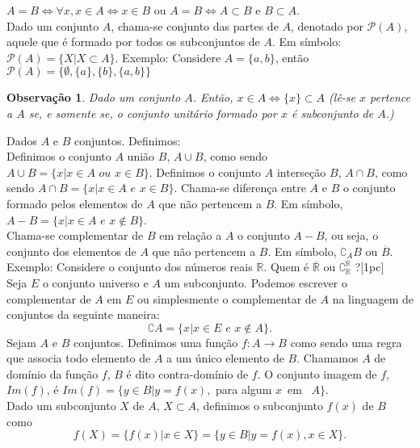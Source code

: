 \documentclass[10pt]{article}
\newtheorem{obs}{Observação}
\begin{document}
 $A=B\Leftrightarrow \forall x, x\in A\Leftrightarrow x\in B$ ou $A=B\Leftrightarrow A\subset B$ e $B\subset A$.\\
 Dado um conjunto $A$, chama-se conjunto das partes de $A$, denotado por $\mathcal{P}(A)$, aquele que é formado por todos os subconjuntos de $A$. Em símbolo: $\mathcal{P}(A)=\{X|X\subset A\}$. Exemplo: Considere $A=\{a,b\}$, então $\mathcal{P}(A)=\{\emptyset, \{a\}, \{b\}, \{a,b\}\}$\\
\begin{obs} Dado um conjunto $A$. Então, $x\in A\Leftrightarrow \{x\}\subset A$ (lê-se $x$ pertence a $A$ se, e somente se, o conjunto unitário formado por $x$ é subconjunto de $A$.)\end{obs}
\noindent Dados $A$ e $B$ conjuntos. Definimos:\\
Definimos o conjunto $A$ união $B$, $A\cup B$, como sendo $A\cup B=\{x| x\in A\, \, ou \, \, x\in B\}$. Definimos o conjunto $A$ interseção $B$, $A\cap B$, como sendo $A\cap B=\{x| x\in A\, \, e\, \, x\in B\}$.
Chama-se diferença entre $A$ e $B$ o conjunto formado pelos elementos de $A$ que não pertencem a $B$. Em símbolo, $A-B=\{x|x\in A\, \, e\, \, x\not\in B\}$.\\
 Chama-se complementar de $B$ em relação a $A$ o conjunto $A-B$, ou seja, o conjunto dos elementos de $A$ que não pertencem a $B$. Em símbolo, $\complement_{A} {B}$ ou $\overline{B}$. Exemplo: Considere o conjunto dos números reais $\mathbb{R}$. Quem é $\overline{\mathbb{R}}$ ou $\complement_{\mathbb{R}}^{\mathbb{R}}$ ?[1pc]\\
 Seja $E$ o conjunto universo  e $A$ um subconjunto. Podemos escrever o complementar de $A$ em $E$ ou simplesmente o complementar de $A$ na linguagem de conjuntos da seguinte maneira: $$\complement A=\{x| x\in E\, \, e\, \, x\not\in A\}.$$
 Sejam $A$ e $B$ conjuntos. Definimos uma função $f:A\rightarrow B$ como sendo uma regra que associa todo elemento de $A$ a um único elemento de $B$. Chamamos $A$ de domínio da função $f$, $B$ é dito contra-domínio de $f$. O conjunto imagem de $f$, $Im(f)$, é $Im(f)=\{y\in B|y=f(x), $ {para algum} $x$\, em \, $A\}$.\\
Dado um subconjunto $X$ de $A$, $X\subset A$, definimos o subconjunto $f(x)$ de $B$ como $$f(X)=\{f(x)| x\in X\}=\{y\in B| y=f(x), x\in X\}.$$
\end{document}
